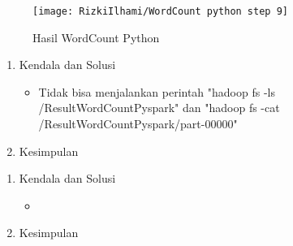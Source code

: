 \begin{figure}[!ht]
    \texttt{[image: RizkiIlhami/WordCount python step 9]}
    \caption{Hasil WordCount Python }
    \label{gam:hasil WordCountPython}
\end{figure}

\clearpage
{}
\begin{enumerate}
\item Kendala dan Solusi

\begin{itemize}
\item Tidak bisa menjalankan perintah {\color{red}"hadoop fs -ls /ResultWordCountPyspark"} dan {\color{red}"hadoop fs -cat /ResultWordCountPyspark/part-00000"}
\end{itemize}


\item Kesimpulan

\end{enumerate}

\clearpage
{}
\begin{enumerate}
\item Kendala dan Solusi

\begin{itemize}
\item
\end{itemize}


\item Kesimpulan

\end{enumerate}
	